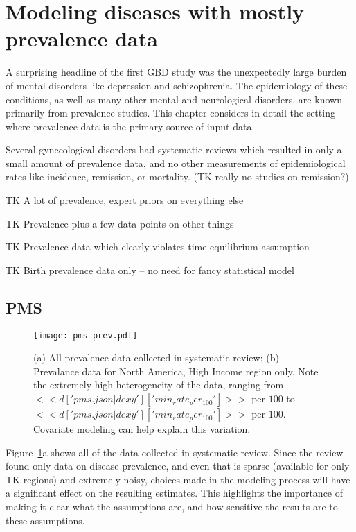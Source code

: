 \section{Modeling diseases with mostly prevalence data}

A surprising headline of the first GBD study was the unexpectedly
large burden of mental disorders like depression and
schizophrenia. The epidemiology of these conditions, as well as many
other mental and neurological disorders, are known primarily from
prevalence studies. This chapter considers in detail the setting where
prevalence data is the primary source of input data.

Several gynecological disorders had systematic reviews which resulted
in only a small amount of prevalence data, and no other measurements
of epidemiological rates like incidence, remission, or mortality.  (TK
really no studies on remission?)

TK A lot of prevalence, expert priors on everything else

TK Prevalence plus a few data points on other things

TK Prevalence data which clearly violates time equilibrium assumption

TK Birth prevalence data only -- no need for fancy statistical model

\subsection{PMS}
\begin{figure}
\begin{center}
\texttt{[image: pms-prev.pdf]}
\end{center}
\caption{(a) All prevalence data collected in systematic review; (b)
  Prevalance data for North America, High Income region only.  Note
  the extremely high heterogeneity of the data, ranging from
  $<<d['pms.json|dexy']['min_rate_per_100']>>$ per $100$ to
  $<<d['pms.json|dexy']['min_rate_per_100']>>$ per $100$.  Covariate
  modeling can help explain this variation.}
\label{pms-prev}
\end{figure}

Figure~\ref{pms-prev}a shows all of the data collected in systematic
review.  Since the review found only data on disease prevalence, and
even that is sparse (available for only TK regions) and extremely
noisy, choices made in the modeling process will have a significant
effect on the resulting estimates.  This highlights the importance of
making it clear what the assumptions are, and how sensitive the
results are to these assumptions.

